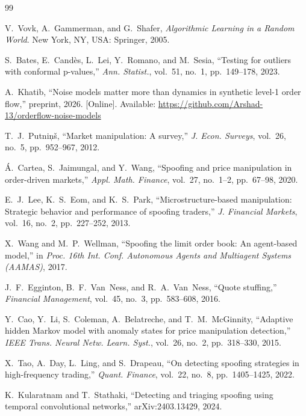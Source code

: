 \documentclass[journal]{IEEEtran}
\begin{document}
\begin{thebibliography}{99}

 V.~Vovk, A.~Gammerman, and G.~Shafer, \emph{Algorithmic Learning in a Random
World}. New York, NY, USA: Springer, 2005.

 S.~Bates, E.~Cand\`es, L.~Lei, Y.~Romano, and M.~Sesia, ``Testing for outliers with
conformal p-values,'' \emph{Ann. Statist.}, vol.~51, no.~1, pp.~149--178, 2023.

 A.~Khatib, ``Noise models matter more than dynamics in synthetic level-1 order flow,''
preprint, 2026. [Online]. Available: \url{https://github.com/Arshad-13/orderflow-noise-models}

 T.~J.~Putni\c{n}\v{s}, ``Market manipulation: A survey,'' \emph{J. Econ. Surveys},
vol.~26, no.~5, pp.~952--967, 2012.

 \'A.~Cartea, S.~Jaimungal, and Y.~Wang, ``Spoofing and price manipulation in
order-driven markets,'' \emph{Appl. Math. Finance}, vol.~27, no.~1--2, pp.~67--98, 2020.

 E.~J.~Lee, K.~S.~Eom, and K.~S.~Park, ``Microstructure-based manipulation:
Strategic behavior and performance of spoofing traders,'' \emph{J. Financial Markets}, vol.~16, no.~2,
pp.~227--252, 2013.

 X.~Wang and M.~P.~Wellman, ``Spoofing the limit order book: An agent-based model,'' in
\emph{Proc. 16th Int. Conf. Autonomous Agents and Multiagent Systems (AAMAS)}, 2017.

 J.~F.~Egginton, B.~F.~Van~Ness, and R.~A.~Van~Ness, ``Quote stuffing,''
\emph{Financial Management}, vol.~45, no.~3, pp.~583--608, 2016.

 Y.~Cao, Y.~Li, S.~Coleman, A.~Belatreche, and T.~M.~McGinnity, ``Adaptive hidden
Markov model with anomaly states for price manipulation detection,'' \emph{IEEE Trans. Neural Netw. Learn.
Syst.}, vol.~26, no.~2, pp.~318--330, 2015.

 X.~Tao, A.~Day, L.~Ling, and S.~Drapeau, ``On detecting spoofing strategies in
high-frequency trading,'' \emph{Quant. Finance}, vol.~22, no.~8, pp.~1405--1425, 2022.

 K.~Kularatnam and T.~Stathaki, ``Detecting and triaging spoofing using temporal
convolutional networks,'' arXiv:2403.13429, 2024.


\end{thebibliography}
\end{document}
